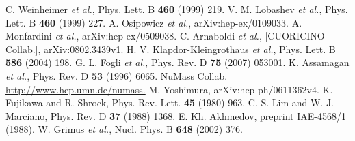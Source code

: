 \begin{thebibliography}{99}
C. Weinheimer \textit{et al.}, Phys. Lett. B \textbf{460} (1999) 219.
V. M. Lobashev \textit{et al.}, Phys. Lett. B \textbf{460} (1999) 227.
A. Osipowicz \textit{et al.}, arXiv:hep-ex/0109033.
A. Monfardini \textit{et al.}, arXiv:hep-ex/0509038.
C. Arnaboldi \textit{et al.}, [CUORICINO Collab.], arXiv:0802.3439v1.
H. V. Klapdor-Kleingrothaus \textit{et al.}, Phys. Lett. B \textbf{586} (2004) 198.
G. L. Fogli \textit{et al.}, Phys. Rev. D \textbf{75} (2007) 053001.
K. Assamagan \textit{et al.}, Phys. Rev. D \textbf{53} (1996) 6065.
NuMass Collab. \url{http://www.hep.umn.de/numass.}
 M. Yoshimura, arXiv:hep-ph/0611362v4.
 K. Fujikawa and R. Shrock, Phys. Rev. Lett. \textbf{45} (1980) 963.
C. S. Lim and W. J. Marciano, Phys. Rev. D \textbf{37} (1988) 1368.
E. Kh. Akhmedov, preprint IAE-4568/1 (1988).
W. Grimus \textit{et al.}, Nucl. Phys. B \textbf{648} (2002) 376.


\end{thebibliography}
